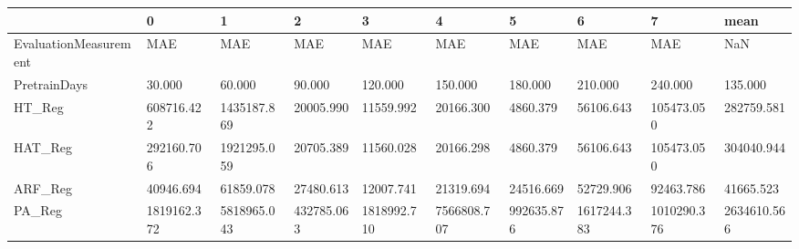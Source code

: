 \begin{tabular}{llllllllll}
\toprule
{} &            0 &            1 &           2 &            3 &            4 &           5 &            6 &            7 &         mean \\
\midrule
EvaluationMeasurement &          MAE &          MAE &         MAE &          MAE &          MAE &         MAE &          MAE &          MAE &          NaN \\
PretrainDays          &       30.000 &       60.000 &      90.000 &      120.000 &      150.000 &     180.000 &      210.000 &      240.000 &      135.000 \\
HT\_Reg                &   608716.422 &  1435187.869 &   20005.990 &    11559.992 &    20166.300 &    4860.379 &    56106.643 &   105473.050 &   282759.581 \\
HAT\_Reg               &   292160.706 &  1921295.059 &   20705.389 &    11560.028 &    20166.298 &    4860.379 &    56106.643 &   105473.050 &   304040.944 \\
ARF\_Reg               &    40946.694 &    61859.078 &   27480.613 &    12007.741 &    21319.694 &   24516.669 &    52729.906 &    92463.786 &    41665.523 \\
PA\_Reg                &  1819162.372 &  5818965.043 &  432785.063 &  1818992.710 &  7566808.707 &  992635.876 &  1617244.383 &  1010290.376 &  2634610.566 \\
\bottomrule
\end{tabular}
